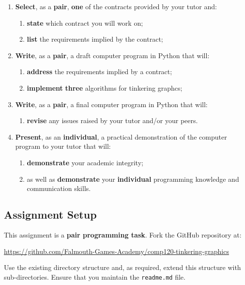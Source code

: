 \documentclass{../fal_assignment}
\begin{document}
\begin{enumerate}[label=(\alph*)]
    \item \textbf{Select}, as a \textbf{pair}, \textbf{one} of the contracts provided by your tutor and:
    	\begin{enumerate}[label=\roman*.]
    		\item \textbf{state} which contract you will work on;
    		\item \textbf{list} the requirements implied by the contract;
	\end{enumerate}
    \item \textbf{Write}, as a \textbf{pair}, a draft computer program in Python that will:
    	\begin{enumerate}[label=\roman*.]
    		\item \textbf{address} the requirements implied by a contract;
    		\item \textbf{implement} \textbf{three} algorithms for tinkering graphcs;
	\end{enumerate}
    \item \textbf{Write}, as a \textbf{pair}, a final computer program in Python that will:
    	\begin{enumerate}[label=\roman*.]
    		\item \textbf{revise} any issues raised by your tutor and/or your peers.
	\end{enumerate}
    \item \textbf{Present}, as an \textbf{individual}, a practical demonstration of the computer program to your tutor that will:
    	\begin{enumerate}[label=\roman*.]
    		\item \textbf{demonstrate} your academic integrity;
    		\item as well as \textbf{demonstrate} your \textbf{individual} programming knowledge and communication skills.
	\end{enumerate}
\end{enumerate}

\subsection*{Assignment Setup}

This assignment is a \textbf{pair programming task}. Fork the GitHub repository at:

\indent \url{https://github.com/Falmouth-Games-Academy/comp120-tinkering-graphics}

Use the existing directory structure and, as required, extend this structure with sub-directories. Ensure that you maintain the \texttt{readme.md} file.
\end{document}
